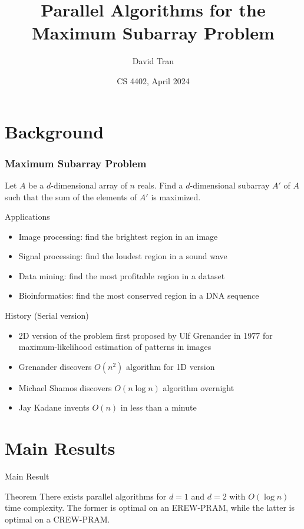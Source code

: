 \documentclass{beamer}
\title{Parallel Algorithms for the Maximum Subarray Problem}
\author{David Tran}
\institute{University of Western Ontario}
\date{CS 4402, April 2024}
\begin{document}
\frame{\titlepage}

\section{Background}

\begin{frame}
  \frametitle{Maximum Subarray Problem}
  Let $A$ be a $d$-dimensional array of $n$ reals. Find a $d$-dimensional subarray $A'$ of $A$ such that the sum of the elements of $A'$ is maximized.
\end{frame}

\begin{frame}{Applications}
  \begin{itemize}
    \item Image processing: find the brightest region in an image
    \item Signal processing: find the loudest region in a sound wave
    \item Data mining: find the most profitable region in a dataset
    \item Bioinformatics: find the most conserved region in a DNA sequence
  \end{itemize}
\end{frame}

\begin{frame}{History (Serial version)}
  \begin{itemize}
    \item 2D version of the problem first proposed by Ulf Grenander in 1977 for maximum-likelihood estimation of patterns in images
    \item Grenander discovers $O(n^2)$ algorithm for 1D version
    \item Michael Shamos discovers $O(n \log n)$ algorithm overnight
    \item Jay Kadane invents $O(n)$ in less than a minute
  \end{itemize}
\end{frame}

\section{Main Results}

\begin{frame}{Main Result}
  \begin{alertblock}{Theorem}
    There exists parallel algorithms for $d = 1$ and $d = 2$ with $O(\log n)$ time complexity. The former is optimal on an EREW-PRAM, while the latter is optimal on a CREW-PRAM.
  \end{alertblock}
\end{frame}
\end{document}
